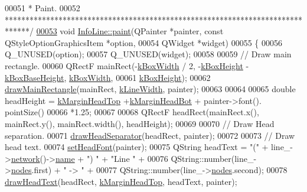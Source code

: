 \begin{DoxyCode}
00051 \textcolor{comment}{ * Paint.}
00052 \textcolor{comment}{ ******************************************************************************/}
\hypertarget{infoline_8cpp_source_l00053}{}\hyperlink{class_info_line_ac696c9944716774dfe85a40ac5a434e1}{00053} \textcolor{keywordtype}{void} \hyperlink{class_info_line_ac696c9944716774dfe85a40ac5a434e1}{InfoLine::paint}(QPainter *painter, \textcolor{keyword}{const} QStyleOptionGraphicsItem *option,
00054                      QWidget *widget)
00055 \{
00056   Q\_UNUSED(option);
00057   Q\_UNUSED(widget);
00058 
00059   \textcolor{comment}{// Draw main rectangle.}
00060   QRectF mainRect(-\hyperlink{class_info_line_a33821aa140dc03829357d4006e9c153c}{kBoxWidth} / 2, -\hyperlink{class_info_line_a9e459549795bab79ae3b6c184dc78a00}{kBoxHeight} - 
      \hyperlink{class_info_line_ab50f47aa54c45def219859e9da3755e6}{kBoxBaseHeight}, \hyperlink{class_info_line_a33821aa140dc03829357d4006e9c153c}{kBoxWidth},
00061                   \hyperlink{class_info_line_a9e459549795bab79ae3b6c184dc78a00}{kBoxHeight});
00062   \hyperlink{class_info_line_a3a0f83ad98fe674513dab679e22cba42}{drawMainRectangle}(mainRect, \hyperlink{class_info_line_ad072bc8ef178113c36c3d480c7d637ac}{kLineWidth}, painter);
00063 
00064 
00065   \textcolor{keywordtype}{double} headHeight = \hyperlink{class_info_line_a73e02db68396f0c4b66d0cf80bd37c83}{kMarginHeadTop} +\hyperlink{class_info_line_a82ed1944ec4a41af19e377a243c2332d}{kMarginHeadBot} + painter->font().
      pointSize()
00066                       *1.25;
00067 
00068   QRectF headRect(mainRect.x(), mainRect.y(), mainRect.width(), headHeight);
00069 
00070   \textcolor{comment}{// Draw Head separation.}
00071   \hyperlink{class_info_line_a53e9012a9cef4f07f1d4872c6d250c08}{drawHeadSeparator}(headRect, painter);
00072 
00073   \textcolor{comment}{// Draw head text.}
00074   \hyperlink{class_info_line_a389ea4f5085b60d03022b94e636f11d1}{setHeadFont}(painter);
00075   QString headText = \textcolor{stringliteral}{"("} + line\_->\hyperlink{group___models_gaa4cfa330c9c53ddaf86c8f5c17ba1ee0}{network}()->\hyperlink{class_network_ab6643733a517f930c60b06f5ffd78186}{name} + \textcolor{stringliteral}{") "} + \textcolor{stringliteral}{"Line "} +
00076                      QString::number(line\_->\hyperlink{class_line_afd17c40d656e6a8d677cb22df5f0c70b}{nodes}.first) + \textcolor{stringliteral}{" -> "} +
00077                      QString::number(line\_->\hyperlink{class_line_afd17c40d656e6a8d677cb22df5f0c70b}{nodes}.second);
00078   \hyperlink{class_info_line_a043932fa92604badc063e09691195609}{drawHeadText}(headRect, \hyperlink{class_info_line_a73e02db68396f0c4b66d0cf80bd37c83}{kMarginHeadTop}, headText, painter);

\end{DoxyCode}
